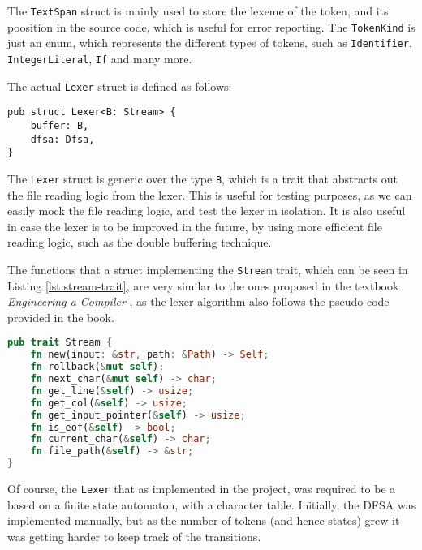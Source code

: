\documentclass{article}
\newcommand{\code}[1]{\texttt{#1}}
\begin{document}
The \code{TextSpan} struct is mainly used to store the lexeme of the token, and
its poosition in the source code, which is useful for error reporting. The
\code{TokenKind} is just an enum, which represents the different types of tokens, such as \code{Identifier},
\code{IntegerLiteral}, \code{If} and many more.


The actual \code{Lexer} struct is defined as follows:

\begin{mainbox}{}
    \begin{lstlisting}[caption={The \code{Lexer} struct.}]
pub struct Lexer<B: Stream> {
    buffer: B,
    dfsa: Dfsa,
}
    \end{lstlisting}
\end{mainbox}

The \code{Lexer} struct is generic over the type \code{B}, which is a trait that
abstracts out the file reading logic from the lexer. This is useful for testing
purposes, as we can easily mock the file reading logic, and test the lexer in
isolation. It is also useful in case the lexer is to be improved in the future,
by using more efficient file reading logic, such as the double buffering
technique.

The functions that a struct implementing the \code{Stream} trait, which can be
seen in Listing \ref{lst:stream-trait}, are very similar to the ones proposed in
the textbook \textit{Engineering a Compiler} \cite{engineering-a-compiler}, as the
lexer algorithm also follows the pseudo-code provided in the book.

\begin{mainbox}{}
    \lstset{xleftmargin=1cm}
    \begin{lstlisting}[language=Rust,caption={The \code{Stream} trait.}]
pub trait Stream {
    fn new(input: &str, path: &Path) -> Self;
    fn rollback(&mut self);
    fn next_char(&mut self) -> char;
    fn get_line(&self) -> usize;
    fn get_col(&self) -> usize;
    fn get_input_pointer(&self) -> usize;
    fn is_eof(&self) -> bool;
    fn current_char(&self) -> char;
    fn file_path(&self) -> &str;
}
    \end{lstlisting}
    \label{lst:stream-trait}
\end{mainbox}

Of course, the \code{Lexer} that as implemented in the project, was required to
be a based on a finite state automaton, with a character table. Initially, the
DFSA was implemented manually, but as the number of tokens (and hence states)
grew it was getting harder to keep track of the transitions.
\end{document}
